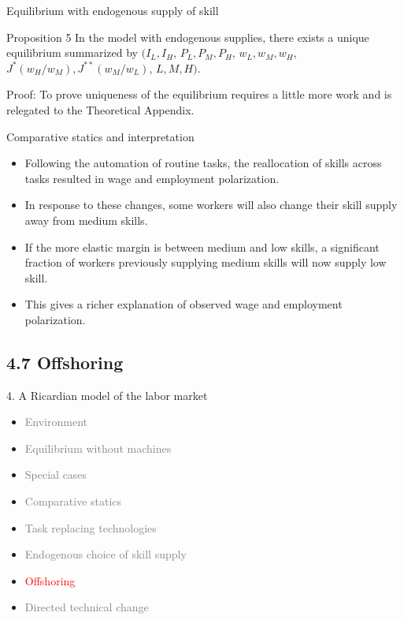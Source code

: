 \documentclass[notes=show]{beamer}
\begin{document}
\begin{frame}{Equilibrium with endogenous supply of skill}
\begin{block}{Proposition 5}
In the model with endogenous supplies, there exists a unique equilibrium summarized by $(I_{L}, I_{H}$, $P_{L}, P_{M}, P_{H}$, $w_{L}, w_{M}, w_{H}$, $J^{*}(w_{H}/w_{M}), J^{**}(w_{M}/w_{L})$, $L,M,H)$.
\end{block}
Proof: To prove uniqueness of the equilibrium requires a little more work and is relegated to the Theoretical Appendix.
\end{frame}

\begin{frame}{Comparative statics and interpretation}
\begin{itemize}
\item Following the automation of routine tasks, the reallocation of skills across tasks resulted in wage and employment polarization. \medskip
\item In response to these changes, some workers will also change their skill supply away from medium skills. \medskip
\item If the more elastic margin is between medium and low skills, a significant fraction of workers previously supplying medium skills will now supply low skill. \medskip
\item This gives a richer explanation of observed wage and employment polarization.
\end{itemize}
\end{frame}

\subsection{4.7 Offshoring}

\begin{frame}{4. A Ricardian model of the labor market}
\begin{itemize}
\item[\textcolor{gray}{4.1}] \textcolor{gray}{Environment}
\item[\textcolor{gray}{4.2}] \textcolor{gray}{Equilibrium without machines}
\item[\textcolor{gray}{4.3}] \textcolor{gray}{Special cases}
\item[\textcolor{gray}{4.4}] \textcolor{gray}{Comparative statics}
\item[\textcolor{gray}{4.5}] \textcolor{gray}{Task replacing technologies}
\item[\textcolor{gray}{4.6}] \textcolor{gray}{Endogenous choice of skill supply}
\item[\textcolor{red}{4.7}] \textcolor{red}{Offshoring}
\item[\textcolor{gray}{4.8}] \textcolor{gray}{Directed technical change}
\end{itemize}
\end{frame}
\end{document}
